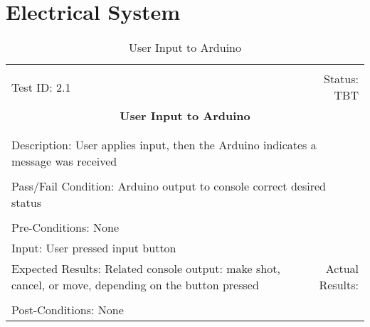 \documentclass[titlepage]{article}
\begin{document}
\section{Electrical System}
\begin{center}%
\begin{table}
\begin{tabular}{|l r|}\hline&\\[-2mm]
	Test ID: 2.1	&Status: TBT\\[-3mm]
	\multicolumn{2}{|c|}{\textbf{\large{User Input to Arduino}}}\\&\\\hline&\\[-3mm]
	\multicolumn{2}{|p{\textwidth}|}{Description: User applies input, then the Arduino indicates a message was received}\\[1mm]\hline&\\[-3mm]
	\multicolumn{2}{|p{\textwidth}|}{Pass/Fail Condition: Arduino output to console correct desired status}\\[1mm]\hline&\\[-3mm]
	\multicolumn{2}{|p{\textwidth}|}{Pre-Conditions: None}\\[4mm]
	\multicolumn{2}{|p{\textwidth}|}{Input: User pressed input button}\\[2mm]\hline
	\multicolumn{1}{|p{0.49\textwidth}}{Expected Results: Related console output: make shot, cancel, or move, depending on the button pressed}	&\multicolumn{1}{|p{0.45\textwidth}|}{Actual Results:}\\\hline&\\[-3mm]
	\multicolumn{2}{|p{\textwidth}|}{Post-Conditions: None}\\\hline
\end{tabular}
\caption{User Input to Arduino}
\end{table}
\end{center}
\end{document}
